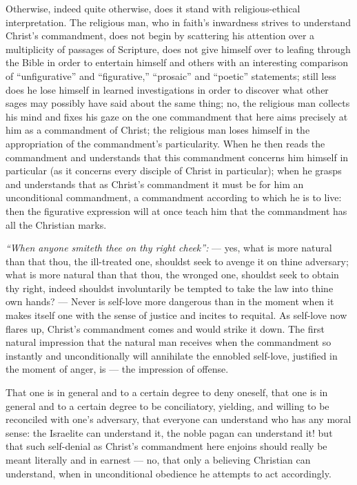 \documentclass[12pt,a4paper]{book}
\begin{document}
Otherwise, indeed quite otherwise, does it stand with religious-ethical
interpretation. The religious man, who in faith's inwardness strives to understand
Christ's commandment, does not begin by scattering his attention over a multiplicity
of passages of Scripture, does not give himself over to leafing through the Bible in
order to entertain himself and others with an interesting comparison of
``unfigurative'' and ``figurative,'' ``prosaic'' and ``poetic'' statements; still less
does he lose himself in learned investigations in order to discover what other sages
may possibly have said about the same thing; no, the religious man collects his mind
and fixes his gaze on the one commandment that here aims precisely at him as a
commandment of Christ; the religious man loses himself in the appropriation of the
commandment's particularity. When he then reads the commandment and understands that
this commandment concerns him himself in particular (as it concerns every disciple of
Christ in particular); when he grasps and understands that as Christ's commandment it
must be for him an unconditional commandment, a commandment according to which he is
to live: then the figurative expression will at once teach him that the commandment
has all the Christian marks.

\emph{``When anyone smiteth thee on thy right cheek'':} --- yes, what is more natural
than that thou, the ill-treated one, shouldst seek to avenge it on thine adversary;
what is more natural than that thou, the wronged one, shouldst seek to obtain thy
right, indeed shouldst involuntarily be tempted
to take the law into thine own hands? --- Never is self-love more dangerous than in
the moment when it makes itself one with the sense of justice and incites to
requital. As self-love now flares up, Christ's commandment comes and would strike it
down. The first natural impression that the natural man receives when the commandment
so instantly and unconditionally will annihilate the ennobled self-love, justified in
the moment of anger, is --- the impression of offense.

That one is in general and to a certain degree to deny oneself, that one is in
general and to a certain degree to be conciliatory, yielding, and willing to be
reconciled with one's adversary, that everyone can understand who has any moral
sense: the Israelite can understand it, the noble pagan can understand it! but that
such self-denial as Christ's commandment here enjoins should really be meant
literally and in earnest --- no, that only a believing Christian can understand, when
in unconditional obedience he attempts to act accordingly.
\end{document}
